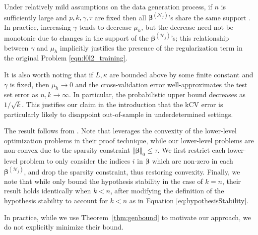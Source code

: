 \documentclass[mnsc,nonblindrev]{informs3} %
\begin{document}
{Under relatively mild assumptions on the data generation process, if $n$ is sufficiently large and $p,k, \gamma, \tau$ are fixed then all $\bm{\beta}^{(\mathcal{N}_j)}$'s share the same support \citep{gamarnik2022sparse,bertsimas2020sparse}. In practice, increasing $\gamma$ tends to decrease $\mu_h$, but the decrease need not be monotonic due to changes in the support of the $\bm{\beta}^{(\mathcal{N}_j)}$'s; this relationship between $\gamma$ and $\mu_h$ implicitly justifies the presence of the regularization term in the original Problem \eqref{eqn:l0l2_training}.

It is also worth noting that if $L, \kappa$ are bounded above by some finite constant and $\gamma$ is fixed, then $\mu_h \rightarrow 0$ and the cross-validation error well-approximates the test set error as $n,k \rightarrow \infty$. In particular, the probabilistic upper bound decreases as $1/\sqrt{k}$. This justifies our claim in the introduction that the kCV error is particularly likely to disappoint out-of-sample in underdetermined settings.

The result follows from \citep[Theorem 22]{bousquet2002stability}. Note that \citet{bousquet2002stability} leverages the convexity of the lower-level optimization problems in their proof technique, while our lower-level problems are non-convex due to the sparsity constraint $\Vert \bm{\beta}\Vert_0 \leq \tau$. We first restrict each lower-level problem to only consider the indices $i$ in $\bm{\beta}$ which are non-zero in each $\bm{\beta}^{(\mathcal{N}_j)}$, and drop the sparsity constraint, thus restoring convexity. Finally, we note that while \cite{bousquet2002stability} only bound the hypothesis stability in the case of $k=n$, their result holds identically when $k<n$, after modifying the definition of the hypothesis stability to account for $k<n$ as in Equation \eqref{eq:hypothesisStability}. 
\Halmos
\endproof


In practice, while we use Theorem~\ref{thm:genbound} to motivate our approach, we do not explicitly minimize their bound. 

}
\end{document}
